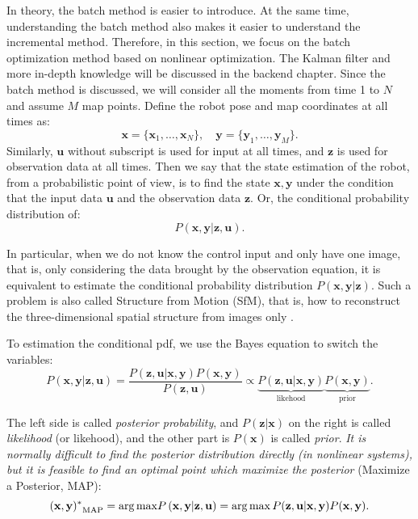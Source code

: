 In theory, the batch method is easier to introduce. At the same time, understanding the batch method also makes it easier to understand the incremental method. Therefore, in this section, we focus on the batch optimization method based on nonlinear optimization. The Kalman filter and more in-depth knowledge will be discussed in the backend chapter. Since the batch method is discussed, we will consider all the moments from time 1 to $N$ and assume $M$ map points. Define the robot pose and map coordinates at all times as:
\[
\mathbf{x}=\{ \mathbf{x}_1, \ldots, \mathbf{x}_N \}, \quad \mathbf{y} = \{\mathbf{y}_1, \ldots, \mathbf{y}_M \}.
\]
Similarly, $ \mathbf {u} $ without subscript is used for input at all times, and $ \mathbf {z} $ is used for observation data at all times. Then we say that the state estimation of the robot, from a probabilistic point of view, is to find the state $ \mathbf {x}, \mathbf{y}$ under the condition that the input data $ \mathbf {u} $ and the observation data $\mathbf{z} $. Or, the conditional probability distribution of:
\begin{equation}
P( \mathbf{x},\mathbf{y} | \mathbf{z}, \mathbf{u}).
\end{equation}


In particular, when we do not know the control input and only have one image, that is, only considering the data brought by the observation equation, it is equivalent to estimate the conditional probability distribution $ P (\mathbf {x}, \mathbf {y} | \mathbf { z}) $. Such a problem is also called Structure from Motion (SfM), that is, how to reconstruct the three-dimensional spatial structure from images only {\cite {Agarwal2009}}.

To estimation the conditional pdf, we use the Bayes equation to switch the variables:
\begin{equation}
P\left( { \mathbf{x},\mathbf{y}| \mathbf{z}, \mathbf{u}} \right) = \frac{{P\left( {\mathbf{z},\mathbf{u}|\mathbf{x},\mathbf{y}} \right)P\left( \mathbf{x}, \mathbf{y} \right)}}{{P\left( \mathbf{z},\mathbf{u}\right)}} \propto \underbrace{P\left(  { \mathbf{z},\mathbf{u}| \mathbf{x},\mathbf{y} } \right)}_{\text{likehood}} \underbrace{P\left( \mathbf{x},\mathbf{y} \right)}_{\text{prior}}.
\end{equation}

The left side is called \textit {posterior probability}, and $ P (\mathbf {z} | \mathbf {x}) $ on the right is called \textit {likelihood} (or likehood), and the other part is $ P (\mathbf {x}) $ is called \textit {prior}. \textit {It is normally difficult to find the posterior distribution directly (in nonlinear systems), but it is feasible to find an optimal point which maximize the posterior} (Maximize a Posterior, MAP):
\begin{equation}
{(\mathbf{x},\mathbf{y})^*}_{\mathrm{MAP}} = \arg {\mathop{\rm max}\nolimits} P \left( {\mathbf{x},\mathbf{y}|\mathbf{z},\mathbf{u}} \right) = \arg \max P(\mathbf{z},\mathbf{u}|\mathbf{x},\mathbf{y})P(\mathbf{x},\mathbf{y}).
\end{equation}

